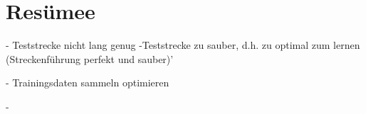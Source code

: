%
\chapter{Resümee}

- Teststrecke nicht lang genug 
-Teststrecke zu sauber, d.h. zu optimal zum lernen (Streckenführung perfekt und sauber)'

- Trainingsdaten sammeln optimieren

- 
